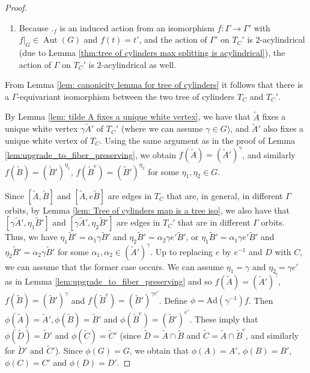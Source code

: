 \documentclass{amsart}
\DeclareMathOperator{\Aut}{Aut}
\theoremstyle{plain}
\theoremstyle{definition}
\theoremstyle{remark}
\begin{document}
\begin{proof}
\begin{enumerate}
    \item Because $._f$ is an induced action from an isomorphism $f: \Gamma \to \Gamma'$ with $f|_G \in \Aut(G)$ and  $f(t)=t'$, and the action of $\Gamma'$ on $T_C'$ is $2$-acylindrical (due to Lemma \ref{thm:tree of cylinders max splitting is acylindrical}), the action of $\Gamma$ on $T_C'$ is $2$-acylindrical as well.
\end{enumerate}

From Lemma \ref{lem: canonicity lemma for tree of cylinders} it follows that there is a $\Gamma$-equivariant isomorphism between the two tree of cylinders $T_C$ and $T_C'$. 

By Lemma \ref{lem: tilde A fixes a unique white vertex}, we have that $\tilde{A}$ fixes a unique white vertex $\gamma \tilde{A}'$ of $T_C'$ (where we can assume $\gamma \in G$), and $\tilde{A}'$ also fixes a unique white vertex of $T_C$. Using the same argument as in the proof of Lemma \ref{lem:upgrade_to_fiber_preserving}, we obtain $f(\tilde{A}) = (\tilde{A}')^{\gamma}$, and similarly $f(\tilde{B}) = (\tilde{B}')^{\eta_1}$, $f(\tilde{B}^e) = (\tilde{B}')^{\eta_2}$ for some $\eta_1,\eta_2 \in G$.

Since $[\tilde{A}, \tilde{B}]$ and $[\tilde{A}, e\tilde{B}]$ are edges in $T_C$ that are, in general, in different $\Gamma$ orbits, by Lemma \ref{lem: Tree of cylinders map is a tree iso}, we also have that $[\gamma \tilde{A}', \eta_1 \tilde{B}']$ and $[\gamma \tilde{A}', \eta_2 \tilde{B}']$ are edges in $T_C'$ that are in different $\Gamma$ orbits. Thus, we have $\eta_1 \tilde{B}' = \alpha_1 \gamma \tilde{B}'$ and $\eta_2 \tilde{B}' = \alpha_2 \gamma e' \tilde{B}'$, or $\eta_1 \tilde{B}' = \alpha_1 \gamma e' \tilde{B}'$ and $\eta_2 \tilde{B}' = \alpha_2 \gamma \tilde{B}'$ for some $\alpha_1, \alpha_2 \in (\tilde{A}')^{\gamma}$. Up to replacing $e$ by $e^{-1}$ and $D$ with $C$, we can assume that the former case occurs. We can assume $\eta_1 = \gamma$ and $\eta_2 = \gamma e'$ as in Lemma \ref{lem:upgrade_to_fiber_preserving} and so $f(\tilde{A}) = (\tilde{A}')^{\gamma}$, $f(\tilde{B}) = (\tilde{B}')^{\gamma}$ and $f(\tilde{B}^e) = (\tilde{B}')^{\gamma e'}$. Define $\phi = \mathrm{Ad}(\gamma^{-1}) f$. Then $\phi(\tilde{A}) = \tilde{A}', \phi(\tilde{B}) = \tilde{B}'$ and $\phi(\tilde{B}^e) = (\tilde{B}')^{e'}$. These imply that $\phi(\tilde{D}) = \tilde{D}'$ and $\phi(\tilde{C}) = \tilde{C}'$ (since $\tilde{D} = \tilde{A} \cap \tilde{B}$ and $\tilde{C} = \tilde{A} \cap \tilde{B}^e$, and similarly for $\tilde{D}'$ and $\tilde{C}'$). Since $\phi (G) = G$, we obtain that $\phi(A) = A'$, $\phi(B) = B'$, $\phi(C) = C'$ and $\phi(D) = D'$.


\end{proof}
\end{document}
